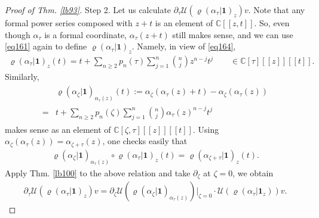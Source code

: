 \documentclass[11pt,b5paper,notitlepage]{article}
\theoremstyle{definition}
\theoremstyle{plain}
\newcommand{\mc}{\mathcal}
\newcommand{\id}{\mathbf{1}}
\newcommand{\Cbb}{\mathbb C}
\numberwithin{equation}{section}
\begin{document}
\begin{proof}[Proof of Thm. \ref{lb93}]
Step 2. Let us calculate $\partial_\tau \mc U(\varrho(\alpha_\tau|\id)_z)v$. Note that any formal power series composed with $z+t$ is an element of $\Cbb[[z,t]]$. So, even though $\alpha_\tau$ is a formal coordinate, $\alpha_\tau(z+t)$ still makes sense, and we can use \eqref{eq161} again to define $\varrho(\alpha_\tau|\id)_z$. Namely, in view of \eqref{eq164},
\begin{align*}
\varrho(\alpha_\tau|\id)_z(t)=t+\sum_{n\geq 2}p_n(\tau)\sum_{j=1}^n{n\choose j}z^{n-j}t^j\qquad \in\Cbb[\tau][[z]][[t]].	
\end{align*}
Similarly, 
\begin{align}\label{eq171}
	\begin{aligned}
&\varrho(\alpha_\zeta|\id)_{\alpha_\tau(z)}(t):=\alpha_\zeta(\alpha_\tau(z)+t)-\alpha_\zeta(\alpha_\tau(z))	\\
=&t+\sum_{n\geq 2}p_n(\zeta)\sum_{j=1}^n{n\choose j}\alpha_\tau(z)^{n-j}t^j
	\end{aligned}
\end{align}
makes sense as an element of $\Cbb[\zeta,\tau][[z]][[t]]$. Using $\alpha_\zeta(\alpha_\tau(z))=\alpha_{\zeta+\tau}(z)$, one checks easily that
\begin{align*}
\varrho(\alpha_\zeta|\id)_{\alpha_\tau(z)}\circ \varrho(\alpha_\tau|\id)_z(t)=\varrho(\alpha_{\zeta+\tau}|\id)_z(t).	
\end{align*}
Apply Thm. \ref{lb100} to the above relation and take $\partial_\zeta$ at $\zeta=0$, we obtain
\begin{align}
\partial_\tau \mc U(\varrho(\alpha_\tau|\id)_z)v=\partial_\zeta\mc U(\varrho(\alpha_\zeta|\id)_{\alpha_\tau(z)})\big|_{\zeta=0}\cdot \mc U(\varrho(\alpha_\tau|\id_z))v.	
\end{align}


\end{proof}
\end{document}
